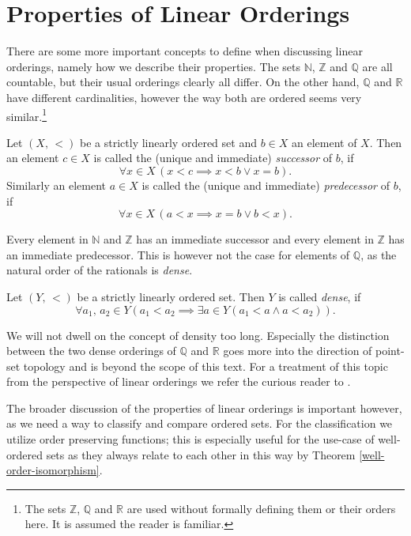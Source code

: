 \documentclass[../../main.tex]{subfiles}
\begin{document}
\section{Properties of Linear Orderings}

There are some more important concepts to define when discussing linear orderings, namely how we describe their properties.
The sets $\mathbb{N}$, $\mathbb{Z}$ and $\mathbb{Q}$ are all countable, but their usual orderings clearly all differ.
On the other hand, $\mathbb{Q}$ and $\mathbb{R}$ have different cardinalities, 
however the way both are ordered seems very similar.\footnote{The sets $\mathbb{Z}$, $\mathbb{Q}$ and $\mathbb{R}$ are used without formally defining them or their orders here.
It is assumed the reader is familiar.}

\begin{definition}\cite[Definition 1.20]{Ros82}
    Let $(X,\, <)$ be a strictly linearly ordered set and $b \in X$ an element of $X$.
    Then an element $c \in X$ is called the (unique and immediate) \textit{successor} of $b$, if
    $$\forall x \in X \, \left(x < c \implies x < b \vee x = b\right).$$
    Similarly an element $a \in X$ is called the (unique and immediate) \textit{predecessor} of $b$, if
    $$\forall x \in X \, \left(a < x \implies x = b \vee b < x\right).$$
\end{definition}
Every element in $\mathbb{N}$ and $\mathbb{Z}$ has an immediate successor and every element in $\mathbb{Z}$ has an immediate predecessor.
This is however not the case for elements of $\mathbb{Q}$, as the natural order of the rationals is \textit{dense}.

\begin{definition}\cite[Definition 2.1]{Ros82}
    Let $(Y,\, <)$ be a strictly linearly ordered set.
    Then $Y$ is called \textit{dense}, if
    $$\forall a_1,\, a_2 \in Y \left(a_1 < a_2 \implies \exists a \in Y \left(a_1 < a \wedge a < a_2\right)\right).$$
\end{definition}

We will not dwell on the concept of density too long.
Especially the distinction between the two dense orderings of $\mathbb{Q}$ and $\mathbb{R}$ goes more into the direction of point-set topology and is beyond the scope of this text.
For a treatment of this topic from the perspective of linear orderings we refer the curious reader to \cite[\S 2]{Ros82}.

The broader discussion of the properties of linear orderings is important however, as we need a way to classify and compare ordered sets.
For the classification we utilize order preserving functions; this is especially useful for the use-case of well-ordered sets as they always relate to each other in this way by Theorem \ref{well-order-isomorphism}.
\end{document}
